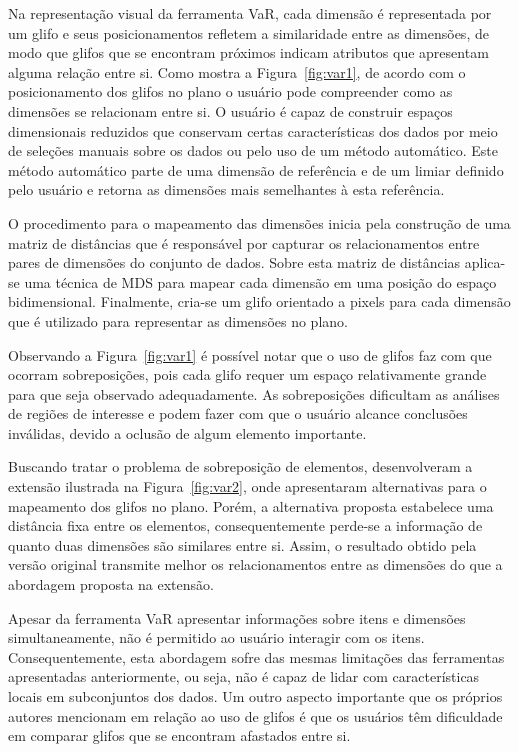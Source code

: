 Na representação visual da ferramenta VaR, cada dimensão é
representada por um glifo e seus posicionamentos refletem a
similaridade entre as dimensões, de modo que glifos que se
encontram próximos indicam atributos que apresentam alguma
relação entre si. Como mostra a Figura~\ref{fig:var1}, de
acordo com o posicionamento dos glifos no plano o usuário
pode compreender como as dimensões se relacionam entre si. O
usuário é capaz de construir espaços dimensionais reduzidos
que conservam certas características dos dados por meio de
seleções manuais sobre os dados ou pelo uso de um método automático.
Este método automático parte de uma dimensão de referência e
de um limiar definido pelo usuário e retorna as dimensões
mais semelhantes à esta referência.

O procedimento para o mapeamento das dimensões inicia
pela construção de uma matriz de distâncias que é
responsável por capturar os relacionamentos entre pares de
dimensões do conjunto de dados. Sobre esta matriz de
distâncias aplica-se uma técnica de MDS para mapear cada
dimensão em uma posição do espaço bidimensional.
Finalmente, cria-se um glifo orientado a pixels para cada
dimensão que é utilizado para representar as dimensões
no plano.

Observando a Figura~\ref{fig:var1} é possível notar que o
uso de glifos faz com que ocorram sobreposições, pois cada
glifo requer um espaço relativamente grande para que seja
observado adequadamente.  As sobreposições dificultam as
análises de regiões de interesse e podem fazer com que o
usuário alcance conclusões inválidas, devido a oclusão de
algum elemento importante.  

Buscando tratar o problema de sobreposição de elementos,
\citet{Yang2007} desenvolveram a extensão ilustrada na
Figura~\ref{fig:var2}, onde apresentaram alternativas para o
mapeamento dos glifos no plano. Porém, a alternativa
proposta estabelece uma distância fixa entre os elementos,
consequentemente perde-se a informação de quanto duas
dimensões são similares entre si. Assim, o resultado obtido
pela versão original transmite melhor os relacionamentos entre
as dimensões do que a abordagem proposta na extensão. 

Apesar da ferramenta VaR apresentar informações sobre itens
e dimensões simultaneamente, não é permitido ao usuário
interagir com os itens. Consequentemente, esta abordagem
sofre das mesmas limitações das ferramentas apresentadas
anteriormente, ou seja, não é capaz de lidar com  
características locais em subconjuntos dos dados. Um outro
aspecto importante que os próprios autores mencionam em
relação ao uso de glifos é que os usuários têm dificuldade
em comparar glifos que se encontram afastados entre si. 

